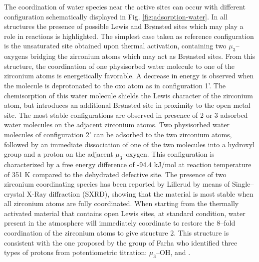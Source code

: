 \npar
The coordination of water species near the active sites can occur with different configuration schematically displayed in Fig. \ref{fig:adsorption-water}. In all structures the presence of possible Lewis and Br\o{}nsted sites which may play a role in reactions is highlighted. The simplest case taken as reference configuration is the unsaturated site obtained upon thermal activation, containing two $\mu_3$--oxygens bridging the zirconium atoms which may act as Br\o{}nsted sites. From this structure, the coordination of one physisorbed water molecule to one of the zirconium atoms is energetically favorable. A decrease in energy is observed when the molecule is deprotonated to the oxo atom as in configuration 1’. The chemisorption of this water molecule shields the Lewis character of the zirconium atom, but introduces an additional Br\o{}nsted site in proximity to the open metal site. 
\npar
The most stable configurations are observed in presence of 2 or 3 adsorbed water molecules on the adjacent zirconium atoms. Two physisorbed water molecules of configuration 2’ can be adsorbed to the two zirconium atoms, followed by an immediate dissociation of one of the two molecules into a hydroxyl group and a proton on the adjacent $\mu_3$--oxygen. This configuration is characterized by a free energy difference of -94.4 kJ/mol at reaction temperature of 351 K compared to the dehydrated defective site. The presence of two zirconium coordinating species has been reported by Lillerud \cite{oien2014detailed} by means of Single--crystal X-Ray diffraction (SXRD), showing that the material is most stable when all zirconium atoms are fully coordinated. When starting from the thermally activated material that contains open Lewis sites, at standard condition, water present in the atmosphere will immediately coordinate to restore the 8--fold coordination of the zirconium atoms to give structure 2. This structure is consistent with the one proposed by the group of Farha \cite{klet2016evaluation} who identified three types of protons from potentiometric titration: $\mu_3$--OH,  and . 
\npar
